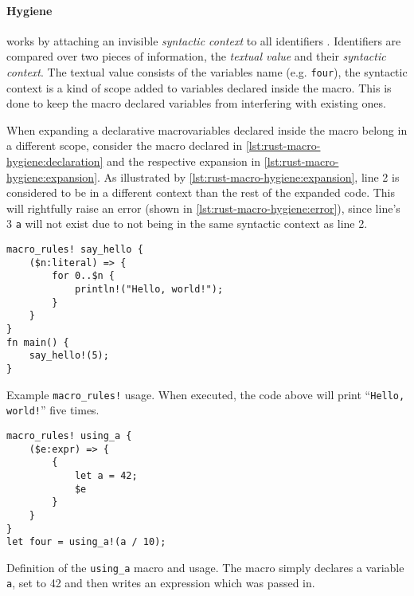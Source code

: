 \paragraph{Hygiene} works by attaching an invisible \emph{syntactic context} to all identifiers \autocite{Wirth2021}.
Identifiers are compared over two pieces of information,
the \emph{textual value} and their \emph{syntactic context}.
The textual value consists of the variables name (e.g. \texttt{four}),
the syntactic context is a kind of scope added to variables declared inside the macro.
This is done to keep the macro declared variables from interfering with existing ones.

When expanding a declarative macro\footnotemark variables declared inside the macro belong in a different scope,
consider the macro declared in \autoref{lst:rust-macro-hygiene:declaration} and
the respective expansion in \autoref{lst:rust-macro-hygiene:expansion}.
As illustrated by \autoref{lst:rust-macro-hygiene:expansion},
line 2 is considered to be in a different context than the rest of the expanded code.
This will rightfully raise an error (shown in \autoref{lst:rust-macro-hygiene:error}),
since line's 3 \texttt{a} will not exist due to not being in the same syntactic context as line 2.


\begin{listing}
    \centering
    \begin{verbatim}
macro_rules! say_hello {
    ($n:literal) => {
        for 0..$n {
            println!("Hello, world!");
        }
    }
}
fn main() {
    say_hello!(5);
}
    \end{verbatim}
    \caption{Example \texttt{macro\_rules!} usage.
        When executed, the code above will print “\texttt{Hello, world!}” five times.}
    \label{lst:rust-macro-rules}
\end{listing}


\begin{listing}
    \begin{verbatim}
macro_rules! using_a {
    ($e:expr) => {
        {
            let a = 42;
            $e
        }
    }
}
let four = using_a!(a / 10);
    \end{verbatim}
    \caption{
        Definition of the \texttt{using\_a} macro and usage.
        The macro simply declares a variable \texttt{a},
        set to 42 and then writes an expression which was passed in.
    }
    \label{lst:rust-macro-hygiene:declaration}
\end{listing}

